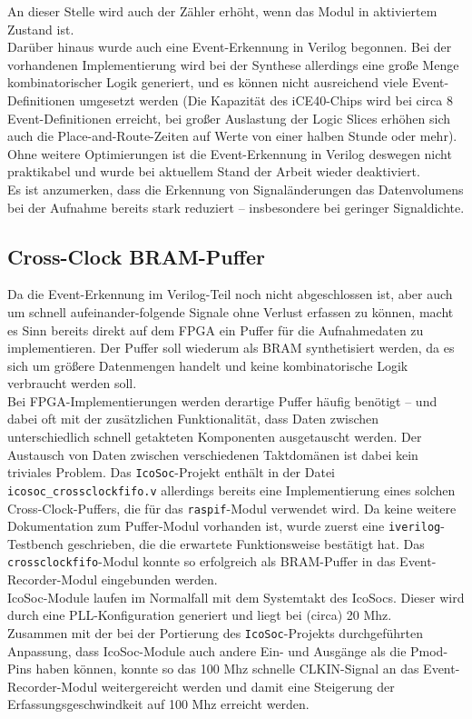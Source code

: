 {\begin{verbatim}
\end{verbatim}
An dieser Stelle wird auch der Zähler erhöht, wenn das Modul in aktiviertem Zustand ist.\\
Darüber hinaus wurde auch eine Event-Erkennung in Verilog begonnen. Bei der vorhandenen Implementierung wird bei der Synthese allerdings eine große Menge kombinatorischer Logik generiert, und es können nicht ausreichend viele Event-Definitionen umgesetzt werden (Die Kapazität des iCE40-Chips wird bei circa 8 Event-Definitionen erreicht, bei großer Auslastung der Logic Slices erhöhen sich auch die Place-and-Route-Zeiten auf Werte von einer halben Stunde oder mehr). \\
Ohne weitere Optimierungen ist die Event-Erkennung in Verilog deswegen nicht praktikabel und wurde bei aktuellem Stand der Arbeit wieder deaktiviert.\\
Es ist anzumerken, dass die Erkennung von Signaländerungen das Datenvolumens bei der Aufnahme bereits stark reduziert -- insbesondere bei geringer Signaldichte.

\subsection{Cross-Clock BRAM-Puffer}

Da die Event-Erkennung im Verilog-Teil noch nicht abgeschlossen ist, aber auch um schnell aufeinander-folgende Signale ohne Verlust erfassen zu können, macht es Sinn bereits direkt auf dem FPGA ein Puffer für die Aufnahmedaten zu implementieren. Der Puffer soll wiederum als BRAM synthetisiert werden, da es sich um größere Datenmengen handelt und keine kombinatorische Logik verbraucht werden soll.\\
Bei FPGA-Implementierungen werden derartige Puffer häufig benötigt -- und dabei oft mit der zusätzlichen Funktionalität, dass Daten zwischen unterschiedlich schnell getakteten Komponenten ausgetauscht werden. Der Austausch von Daten zwischen verschiedenen Taktdomänen ist dabei kein triviales Problem. Das {\tt IcoSoc}-Projekt enthält in der Datei {\tt icosoc\_crossclockfifo.v} allerdings bereits eine Implementierung eines solchen Cross-Clock-Puffers, die für das {\tt raspif}-Modul verwendet wird. Da keine weitere Dokumentation zum Puffer-Modul vorhanden ist, wurde zuerst eine {\tt iverilog}-Testbench geschrieben, die die erwartete Funktionsweise bestätigt hat. Das {\tt crossclockfifo}-Modul konnte so erfolgreich als BRAM-Puffer in das Event-Recorder-Modul eingebunden werden.\\
IcoSoc-Module laufen im Normalfall mit dem Systemtakt des IcoSocs. Dieser wird durch eine PLL-Konfiguration generiert und liegt bei (circa) 20 Mhz.\\
Zusammen mit der bei der Portierung des {\tt IcoSoc}-Projekts durchgeführten Anpassung, dass IcoSoc-Module auch andere Ein- und Ausgänge als die Pmod-Pins haben können, konnte so das 100 Mhz schnelle CLKIN-Signal an das Event-Recorder-Modul weitergereicht werden und damit eine Steigerung der Erfassungsgeschwindkeit auf 100 Mhz erreicht werden.  

}
